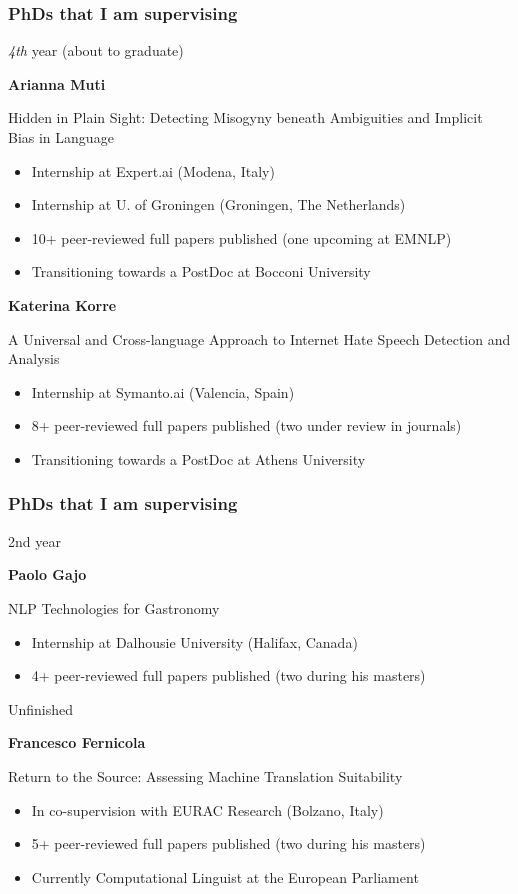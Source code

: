 \documentclass[xcolor=x11names,handout]{beamer}
\begin{document}
\begin{frame}
\frametitle{PhDs that I am supervising}

\alert{\textit{4th} year (about to graduate)}

\textbf{Arianna Muti} 

Hidden in Plain Sight: Detecting Misogyny beneath Ambiguities and Implicit Bias 
in Language				\pause 

\begin{itemize}
 \item Internship at Expert.ai (Modena, Italy)
 \item Internship at U. of Groningen (Groningen, The Netherlands)
 \item 10+ peer-reviewed full papers published (one upcoming at EMNLP)
 \item Transitioning towards a PostDoc at Bocconi University
\end{itemize}					\pause 


\textbf{Katerina Korre}

A Universal and Cross-language Approach to Internet Hate Speech Detection and
Analysis			\pause 

\begin{itemize}
 \item Internship at Symanto.ai (Valencia, Spain)
 \item 8+ peer-reviewed full papers published (two under review in journals)
 \item Transitioning towards a PostDoc at Athens University
\end{itemize}
\end{frame}

\begin{frame}
\frametitle{PhDs that I am supervising}

\alert{2nd year}

\textbf{Paolo Gajo}

NLP Technologies for Gastronomy			\pause

\begin{itemize}
 \item Internship at Dalhousie University (Halifax, Canada)
 \item 4+ peer-reviewed full papers published (two during his masters)
\end{itemize}						\pause 
\bigskip

\alert{Unfinished}

\textbf{Francesco Fernicola}

Return to the Source: Assessing Machine Translation Suitability	\pause 


\begin{itemize}
 \item In co-supervision with EURAC Research (Bolzano, Italy)
 \item 5+ peer-reviewed full papers published (two during his masters)
 \item Currently Computational Linguist at the European Parliament
\end{itemize}


\end{frame}
\end{document}

